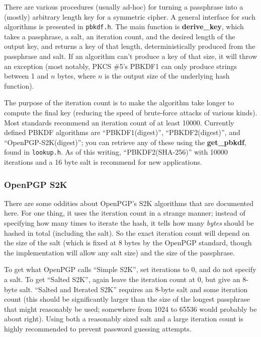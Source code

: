 \documentclass{article}
\newcommand{\filename}[1]{\texttt{#1}}
\newcommand{\function}[1]{\textbf{#1}}
\begin{document}
There are various procedures (usually ad-hoc) for turning a
passphrase into a (mostly) arbitrary length key for a symmetric
cipher. A general interface for such algorithms is presented in
\filename{pbkdf.h}. The main function is \function{derive\_key}, which
takes a passphrase, a salt, an iteration count, and the desired length
of the output key, and returns a key of that length, deterministically
produced from the passphrase and salt. If an algorithm can't produce a
key of that size, it will throw an exception (most notably, PKCS \#5's
PBKDF1 can only produce strings between 1 and $n$ bytes, where $n$ is
the output size of the underlying hash function).

The purpose of the iteration count is to make the algorithm take
longer to compute the final key (reducing the speed of brute-force
attacks of various kinds). Most standards recommend an iteration count
of at least 10000. Currently defined PBKDF algorithms are
``PBKDF1(digest)'', ``PBKDF2(digest)'', and ``OpenPGP-S2K(digest)'';
you can retrieve any of these using the \function{get\_pbkdf}, found in
\filename{lookup.h}. As of this writing, ``PBKDF2(SHA-256)'' with
10000 iterations and a 16 byte salt is recommend for new applications.

\subsubsection{OpenPGP S2K}

There are some oddities about OpenPGP's S2K algorithms that are
documented here. For one thing, it uses the iteration count in a
strange manner; instead of specifying how many times to iterate the
hash, it tells how many \emph{bytes} should be hashed in total
(including the salt). So the exact iteration count will depend on the
size of the salt (which is fixed at 8 bytes by the OpenPGP standard,
though the implementation will allow any salt size) and the size of
the passphrase.

To get what OpenPGP calls ``Simple S2K'', set iterations to 0, and do
not specify a salt. To get ``Salted S2K'', again leave the iteration
count at 0, but give an 8-byte salt. ``Salted and Iterated S2K''
requires an 8-byte salt and some iteration count (this should be
significantly larger than the size of the longest passphrase that
might reasonably be used; somewhere from 1024 to 65536 would probably
be about right). Using both a reasonably sized salt and a large
iteration count is highly recommended to prevent password guessing
attempts.
\end{document}
